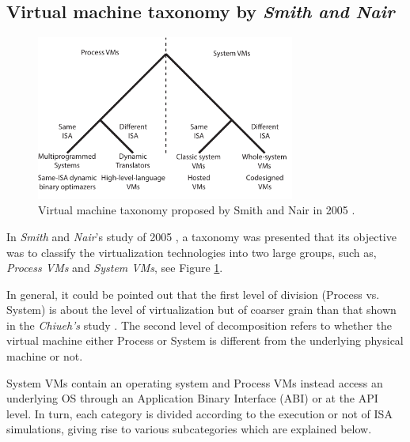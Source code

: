	\subsection{Virtual machine taxonomy by \textit{Smith and Nair}}

	\begin{figure}[H]
		\centering
		\includegraphics[width=8.5cm]{images/Smith2005.pdf}
		\vspace{-0.2cm}
		\caption{Virtual machine taxonomy proposed by Smith and Nair in 2005 \cite{Smith2005}.}
		\label{fig:VMTaxonomySmithNair2005}
	\end{figure}
	
	In \textit{Smith} and \textit{Nair}'s study of 2005 \cite {Smith2005}, a taxonomy was presented that its objective was to classify the virtualization technologies into two large groups, such as, \textit{Process VMs} and \textit{System VMs}, see Figure \ref{fig:VMTaxonomySmithNair2005}. 
	
	 In general, it could be pointed out that the first level of division (Process vs. System) is about the level of virtualization but of coarser grain than that shown in the \textit{Chiueh's} study \cite{Chiueh2005}. The second level of decomposition refers to whether the virtual machine either Process or System is different from the underlying physical machine or not. 
    
    System VMs contain an operating system and Process VMs instead access an underlying OS through an Application Binary Interface (ABI) or at the API level. In turn, each category is divided according to the execution or not of ISA simulations, giving rise to various subcategories which are explained below.
	
    
    
